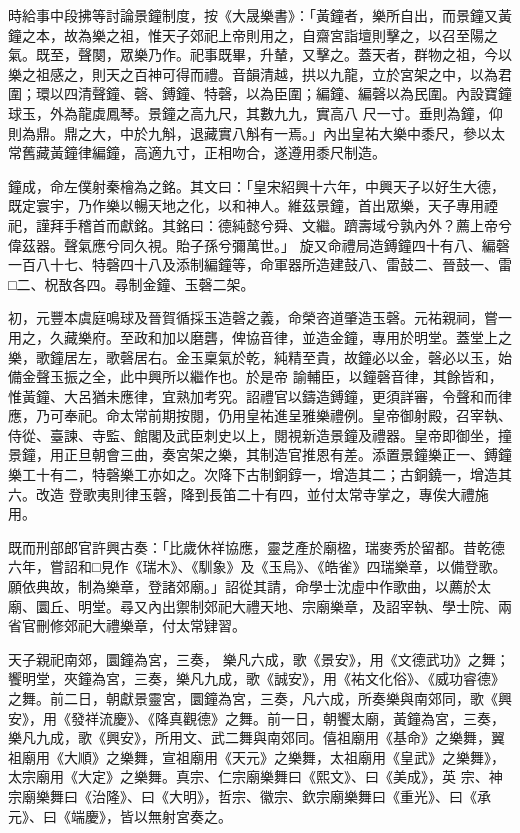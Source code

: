 \begin{pinyinscope}
 時給事中段拂等討論景鐘制度，按《大晟樂書》：「黃鐘者，樂所自出，而景鐘又黃鐘之本，故為樂之祖，惟天子郊祀上帝則用之，自齋宮詣壇則擊之，以召至陽之氣。既至，聲闋，眾樂乃作。祀事既畢，升輦，又擊之。蓋天者，群物之祖，今以樂之祖感之，則天之百神可得而禮。音韻清越，拱以九龍，立於宮架之中，以為君圍；環以四清聲鐘、磬、鎛鐘、特磬，以為臣圍；編鐘、編磬以為民圍。內設寶鐘球玉，外為龍虡鳳琴。景鐘之高九尺，其數九九，實高八
 尺一寸。垂則為鐘，仰則為鼎。鼎之大，中於九斛，退藏實八斛有一焉。」內出皇祐大樂中黍尺，參以太常舊藏黃鐘律編鐘，高適九寸，正相吻合，遂遵用黍尺制造。



 鐘成，命左僕射秦檜為之銘。其文曰：「皇宋紹興十六年，中興天子以好生大德，既定寰宇，乃作樂以暢天地之化，以和神人。維茲景鐘，首出眾樂，天子專用禋祀，謹拜手稽首而獻銘。其銘曰：德純懿兮舜、文繼。躋壽域兮孰內外？薦上帝兮偉茲器。聲氣應兮同久視。貽子孫兮彌萬世。」
 旋又命禮局造鎛鐘四十有八、編磬一百八十七、特磬四十八及添制編鐘等，命軍器所造建鼓八、雷鼓二、晉鼓一、雷□二、柷敔各四。尋制金鐘、玉磬二架。



 初，元豐本虞庭鳴球及晉賀循採玉造磬之義，命榮咨道肇造玉磬。元祐親祠，嘗一用之，久藏樂府。至政和加以磨礱，俾協音律，並造金鐘，專用於明堂。蓋堂上之樂，歌鐘居左，歌磬居右。金玉稟氣於乾，純精至貴，故鐘必以金，磬必以玉，始備金聲玉振之全，此中興所以繼作也。於是帝
 諭輔臣，以鐘磬音律，其餘皆和，惟黃鐘、大呂猶未應律，宜熟加考究。詔禮官以鑄造鎛鐘，更須詳審，令聲和而律應，乃可奉祀。命太常前期按閱，仍用皇祐進呈雅樂禮例。皇帝御射殿，召宰執、侍從、臺諫、寺監、館閣及武臣刺史以上，閱視新造景鐘及禮器。皇帝即御坐，撞景鐘，用正旦朝會三曲，奏宮架之樂，其制造官推恩有差。添置景鐘樂正一、鎛鐘樂工十有二，特磬樂工亦如之。次降下古制銅錞一，增造其二；古銅鐃一，增造其六。改造
 登歌夷則律玉磬，降到長笛二十有四，並付太常寺掌之，專俟大禮施用。



 既而刑部郎官許興古奏：「比歲休祥協應，靈芝產於廟楹，瑞麥秀於留都。昔乾德六年，嘗詔和□見作《瑞木》、《馴象》及《玉烏》、《皓雀》四瑞樂章，以備登歌。願依典故，制為樂章，登諸郊廟。」詔從其請，命學士沈虛中作歌曲，以薦於太廟、圜丘、明堂。尋又內出禦制郊祀大禮天地、宗廟樂章，及詔宰執、學士院、兩省官刪修郊祀大禮樂章，付太常肄習。



 天子親祀南郊，圜鐘為宮，三奏，
 樂凡六成，歌《景安》，用《文德武功》之舞；饗明堂，夾鐘為宮，三奏，樂凡九成，歌《誠安》，用《祐文化俗》、《威功睿德》之舞。前二日，朝獻景靈宮，圜鐘為宮，三奏，凡六成，所奏樂與南郊同，歌《興安》，用《發祥流慶》、《降真觀德》之舞。前一日，朝饗太廟，黃鐘為宮，三奏，樂凡九成，歌《興安》，所用文、武二舞與南郊同。僖祖廟用《基命》之樂舞，翼祖廟用《大順》之樂舞，宣祖廟用《天元》之樂舞，太祖廟用《皇武》之樂舞》，太宗廟用《大定》之樂舞。真宗、仁宗廟樂舞曰《熙文》、曰《美成》，英
 宗、神宗廟樂舞曰《治隆》、曰《大明》，哲宗、徽宗、欽宗廟樂舞曰《重光》、曰《承元》、曰《端慶》，皆以無射宮奏之。




\end{pinyinscope}
